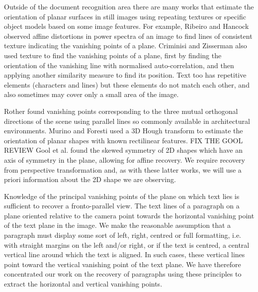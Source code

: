 \documentclass{elsart}   %
\begin{document}
Outside of the document recognition area there are  many works that
estimate the orientation of planar surfaces in still images 
using  repeating textures or specific object models based on some image features.
For example, Ribeiro and Hancock \cite{ribeiro}
observed affine distortions in power spectra of an image to find lines of
consistent texture indicating the vanishing points of a plane. Criminisi and
Zisserman \cite{zisserman} also used texture to find the vanishing points of a
plane,  first by finding the orientation of the vanishing line with normalised
auto-correlation, and then applying another similarity measure to find its position.
Text too has repetitive elements (characters and lines) but
these elements do not match each other, and also sometimes may cover only a
small area of the image.



Rother \cite{rother0} found vanishing points  corresponding  to the three mutual
orthogonal directions of the scene using parallel lines so commonly
available in architectural environments.  Murino and
Foresti \cite{MURIN} used a 3D Hough transform to estimate the orientation of
planar shapes with known rectilinear features. FIX THE GOOL REVIEW Gool et al. 
\cite{GOOL} %
found the skewed symmetry of 2D shapes which have an axis of
symmetry in the plane, allowing for affine recovery.  We require recovery from
perspective transformation and, as with these latter works, we will use a priori
information about the 2D shape we are observing.

Knowledge of the principal vanishing points of the plane on which text lies is
sufficient to recover a fronto-parallel view. The text lines of a paragraph
on a plane oriented relative to the camera  point towards
the horizontal vanishing point of the text plane in the image. We make the
reasonable assumption that a paragraph must display some sort of
 left,  right, centred or full  formatting, i.e. with straight margins on the
left and/or right, or if the text is centred, a central vertical line around which
the text is aligned.  In such cases, these vertical lines point toward the
vertical vanishing point of the text plane.  We have therefore concentrated our
work on the recovery of paragraphs using these principles to extract the
horizontal and vertical vanishing points. 
\end{document}
